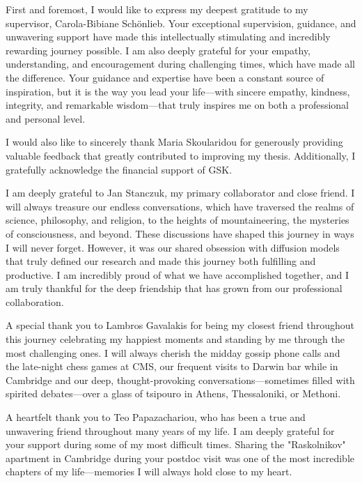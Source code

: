 
\begin{acknowledgements}      

First and foremost, I would like to express my deepest gratitude to my supervisor, Carola-Bibiane Schönlieb. Your exceptional supervision, guidance, and unwavering support have made this intellectually stimulating and incredibly rewarding journey possible. I am also deeply grateful for your empathy, understanding, and encouragement during challenging times, which have made all the difference. Your guidance and expertise have been a constant source of inspiration, but it is the way you lead your life—with sincere empathy, kindness, integrity, and remarkable wisdom—that truly inspires me on both a professional and personal level.

I would also like to sincerely thank Maria Skoularidou for generously providing valuable feedback that greatly contributed to improving my thesis. Additionally, I gratefully acknowledge the financial support of GSK.

I am deeply grateful to Jan Stanczuk, my primary collaborator and close friend. I will always treasure our endless conversations, which have traversed the realms of science, philosophy, and religion, to the heights of mountaineering, the mysteries of consciousness, and beyond. These discussions have shaped this journey in ways I will never forget. However, it was our shared obsession with diffusion models that truly defined our research and made this journey both fulfilling and productive. I am incredibly proud of what we have accomplished together, and I am truly thankful for the deep friendship that has grown from our professional collaboration.

A special thank you to Lambros Gavalakis for being my closest friend throughout this journey celebrating my happiest moments and standing by me through the most challenging ones. I will always cherish the midday gossip phone calls and the late-night chess games at CMS, our frequent visits to Darwin bar while in Cambridge and our deep, thought-provoking conversations—sometimes filled with spirited debates—over a glass of tsipouro in Athens, Thessaloniki, or Methoni.

A heartfelt thank you to Teo Papazachariou, who has been a true and unwavering friend throughout many years of my life. I am deeply grateful for your support during some of my most difficult times. Sharing the "Raskolnikov" apartment in Cambridge during your postdoc visit was one of the most incredible chapters of my life—memories I will always hold close to my heart.


\end{acknowledgements}
